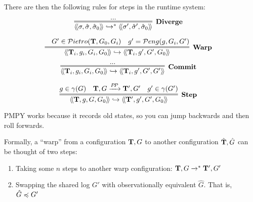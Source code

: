 There are then the following rules for steps in the runtime system:

$$
\infer=[\text{\bf Diverge}]{
   \llangle \sigma,\hat{\sigma},\hat{\sigma}_0 \rrangle 
  \hookrightarrow^{*}
   \llangle \sigma',\hat{\sigma}',\hat{\sigma}_0 \rrangle 
}{ ... }
$$


$$
\infer=[\text{\bf Warp}]{
  \llangle \Ts_i,g_i,G_i,G_0 \rrangle
  \hookrightarrow
  \llangle \Ts_i,g',G',G_0 \rrangle
}{
  & G' \in \Pietrot(\Ts,G_0,G_i)
  & g' = \Pengt(g,G_i,G')
}
$$

$$
\infer=[\text{\bf Commit}]{
  \llangle \Ts_i,g_i,G_i,G_0 \rrangle
  \hookrightarrow
  \llangle \Ts_i,g',G',G' \rrangle
}{ ... }
$$

$$
\infer=[\text{\bf Step}]{
  \llangle \Ts,g,G,G_0 \rrangle
  \hookrightarrow
  \llangle \Ts',g',G',G_0 \rrangle
}{
  g \in \gamma(G)
& \Ts,G \xrightarrow{P\! P} \Ts',G'
& g' \in \gamma(G')}
$$

\vfill
\pagebreak

\bigskip 
\bigskip 
\bigskip 


PMPY works because it records old states, so you can jump backwards
and then roll forwards.


Formally, a ``warp'' from a configuration $\mathbf{T},G$ to another
configuration $\hat{\mathbf{T}},\hat{G}$ can be thought of two steps:
\begin{enumerate}
\item Taking some $n$ steps to another warp configuration:
  $\mathbf{T},G \xrightarrow{}^{*} \mathbf{T}',G'$
\item Swapping the shared log $G'$ with observationally equivalent
  $\hat{G}$. That is,  $\hat{G} \preccurlyeq G'$
\end{enumerate}




